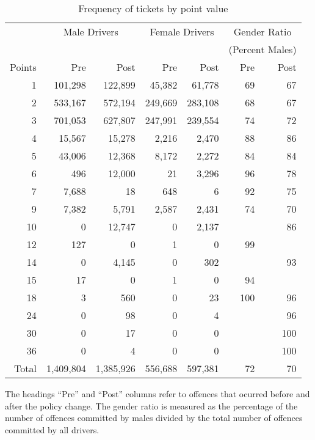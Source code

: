 
\begin{table}%
\centering
\begin{tabular}{r r r r r r r}
  \hline
		& \multicolumn{2}{c}{Male Drivers} 	&  \multicolumn{2}{c}{Female Drivers} &  \multicolumn{2}{c}{Gender Ratio} \\
 & & & & & \multicolumn{2}{c}{(Percent Males)} \\

 \cmidrule(lr){2-3}\cmidrule(lr){4-5}\cmidrule(lr){6-7} 
Points 	& Pre 		& Post		& Pre 		& Post		& Pre 	& Post		\\ 
  \hline
1 		& 101,298 	& 122,899	&  45,382 	&   61,778 	& 69 	& 67 \\ 
2 		& 533,167 	& 572,194	& 249,669 	& 283,108 	& 68 	& 67 \\ 
3 		& 701,053 	& 627,807	& 247,991	& 239,554	& 74 	& 72 \\ 
4 		&  15,567 	&  15,278 	&    2,216 	&    2,470 	& 88 	& 86 \\ 
5 		&  43,006 	&  12,368 	&    8,172 	&    2,272 	& 84 	& 84 \\ 
6 		&     496 	&  12,000 	&        21 	&    3,296 	& 96 	& 78 \\ 
7 		&   7,688 	&        18 	&      648 	&          6 	& 92 	& 75 \\ 
9 		&   7,382 	&    5,791 	&    2,587 	&    2,431 	& 74 	& 70 \\ 
10 		&         0 	&  12,747 	&         0 	&    2,137 	&  		& 86 \\ 
12 		&     127	&         0 	&         1 	&         0 	& 99 	&  \\ 
14 		&       0 	&   4,145 	&         0 	&      302 	&  		& 93 \\ 
15 		&      17 	&         0 	&         1 	&         0 	& 94 	&  \\ 
18 		&       3 	&      560 	&         0 	&        23 	& 100 	& 96 \\ 
24 		&       0 	&       98 	&         0 	&         4 	&  		& 96 \\ 
30 		&       0 	&       17 	&         0 	&         0 	&  		& 100 \\ 
36 		&       0 	&        4 	&         0 	&         0 	&  		& 100 \\ 

   \hline

Total 	  & 1,409,804 & 1,385,926 & 556,688 & 597,381 & 72 & 70 \\ 

   \hline
\end{tabular}
\caption{Frequency of tickets by point value} 
The headings ``Pre'' and ``Post'' columns refer to offences that ocurred before and after the policy change. 
The gender ratio is measured as the percentage of the number of offences committed by males 
divided by the total number of offences committed by all drivers. 
\label{tab:point_freq}
\end{table}